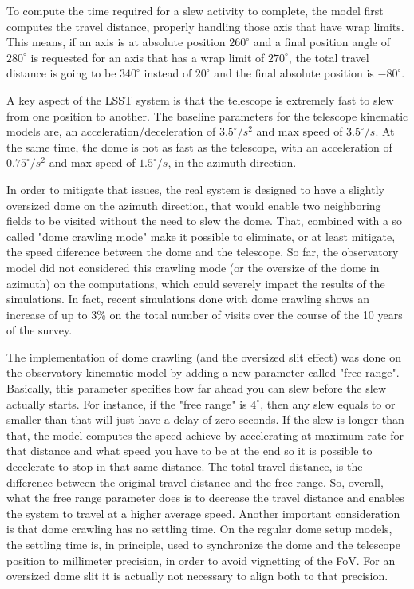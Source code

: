 \documentclass[TS,lsstdraft,toc,usenatbib]{lsstdoc}
\begin{document}
To compute the time required for a slew activity to complete, the model first computes the travel distance, properly handling those axis that have wrap limits. This means, if an axis is at absolute position $260^\circ$  and a final position angle of $280^\circ$   is requested for an axis that has a wrap limit of $270^\circ$, the total travel distance is going to be $340^\circ$ instead of $20^\circ$ and the final absolute position is $-80^\circ$.

A key aspect of the LSST system is that the telescope is extremely fast to slew from one position to another. The baseline parameters for the telescope kinematic models are, an acceleration/deceleration of $3.5^\circ/s^2$ and max speed of $3.5^\circ/s$. At the same time, the dome is not as fast as the telescope, with an acceleration of $0.75^\circ/s^2$ and max speed of $1.5^\circ/s$, in the azimuth direction. 

In order to mitigate that issues, the real system is designed to have a slightly oversized dome on the azimuth direction, that would enable two neighboring fields to be visited without the need to slew the dome. That, combined with a so called "dome crawling mode" make it possible to eliminate, or at least mitigate, the speed diference between the dome and the telescope. So far, the observatory model did not considered this crawling mode (or the oversize of the dome in azimuth) on the computations, which could severely impact the results of the simulations. In fact, recent simulations done with dome crawling shows an increase of up to 3\% on the total number of visits over the course of the 10 years of the survey. 

The implementation of dome crawling (and the oversized slit effect) was done on the observatory kinematic model by adding a new parameter called "free range". Basically, this parameter specifies how far ahead you can slew before the slew actually starts. For instance, if the "free range" is $4^\circ$, then any slew equals to or smaller than that will just have a delay of zero seconds. If the slew is longer than that, the model computes the speed achieve by accelerating at maximum rate for that distance and what speed you have to be at the end so it is possible to decelerate to stop in that same distance. The total travel distance, is the difference between the original travel distance and the free range. So, overall, what the free range parameter does is to decrease the travel distance and enables the system to travel at a higher average speed. Another important consideration is that dome crawling has no settling time. On the regular dome setup models, the settling time is, in principle, used to synchronize the dome and the telescope position to millimeter precision, in order to avoid vignetting of the FoV. For an oversized dome slit it is actually not necessary to align both to that precision. 
\end{document}
